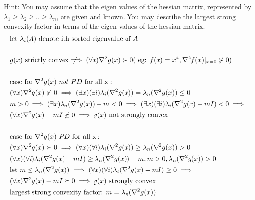 \documentclass[12pt,letter]{article}
\newcommand{\notimplies}{\;\not\!\!\!\implies}
\begin{document}
\begin{enumerate}
\begin{enumerate}
    Hint: You may assume that the eigen values of the hessian matrix, represented by $\lambda_1 \geq
    \lambda_2 \geq .. \geq \lambda_n$, are given and known. You may describe the largest strong convexity factor in terms of the eigen values of the hessian matrix.    
    \begin{align*}
      &\text{let }\lambda_i(A) \text{ denote ith sorted eigenvalue of }A\\
      \\
      &g(x) \text{ strictly convex} \notimplies (\forall x) \nabla^2 g(x) \succ 0 (\text{ eg: } f(x) = x^4, \nabla^2f(x)|_{x=0} \not\succ 0 )\\
      \\
      &\text{case for } \nabla^2 g(x)\ not\ PD \text{ for all x}:\\
      &(\forall x) \nabla^2 g(x) \not\succ 0 \implies (\exists x)(\exists i)\lambda_i(\nabla^2 g(x)) = \lambda_n(\nabla^2 g(x))\leq 0\\
      &m > 0 \implies (\exists x) \lambda_n(\nabla^2 g(x)) - m < 0 \implies (\exists x)(\exists i)\lambda_i(\nabla^2 g(x) -mI) < 0 \implies\\
      & (\forall x) \nabla^2 g(x) -mI \not \succeq 0 \implies g(x) \text{ not strongly convex}\\
      \\
      &\text{case for } \nabla^2 g(x)\ PD \text{ for all x}:\\
      &(\forall x) \nabla^2 g(x) \succ 0 \implies (\forall x)(\forall i)\lambda_i(\nabla^2 g(x)) \geq \lambda_n(\nabla^2 g(x)) > 0\\
      &(\forall x)(\forall i)\lambda_i(\nabla^2 g(x) -mI) \geq \lambda_n(\nabla^2 g(x)) - m, m >0, \lambda_n(\nabla^2 g(x))>0\\
      &\text{let }m \leq \lambda_n(\nabla^2 g(x)) \implies (\forall x)(\forall i)\lambda_i(\nabla^2 g(x) -mI) \geq 0 \implies\\
      &(\forall x) \nabla^2 g(x) -mI \succeq 0 \implies g(x) \text{ strongly convex}\\
      &\text{largest strong convexity factor: } m = \lambda_n(\nabla^2 g(x))
    \end{align*}
  \end{enumerate}

  \pagebreak
  

\end{enumerate}
\end{document}
